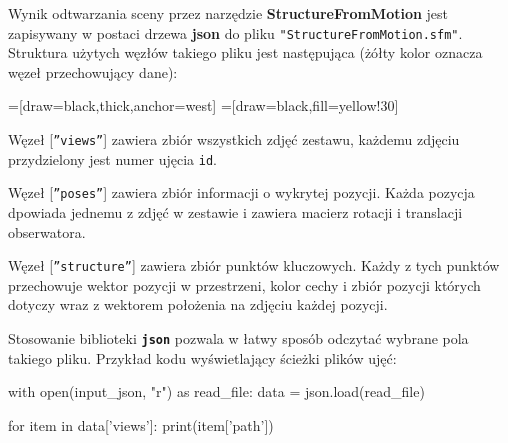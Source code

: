 Wynik odtwarzania sceny przez narzędzie \textbf{StructureFromMotion} jest zapisywany w postaci drzewa \textbf{json} do pliku \texttt{"StructureFromMotion.sfm"}.
Struktura użytych węzłów takiego pliku jest następująca (żółty kolor oznacza węzeł przechowujący dane):

=[draw=black,thick,anchor=west]
=[draw=black,fill=yellow!30]

Węzeł [\texttt{”views”}] zawiera zbiór wszystkich zdjęć zestawu, każdemu zdjęciu przydzielony jest numer ujęcia \texttt{id}.

Węzeł [\texttt{”poses”}] zawiera zbiór informacji o wykrytej pozycji. Każda pozycja dpowiada jednemu z zdjęć w zestawie i zawiera macierz rotacji i translacji obserwatora.

Węzeł [\texttt{”structure”}] zawiera zbiór punktów kluczowych. Każdy z tych punktów przechowuje wektor pozycji w przestrzeni, kolor cechy i zbiór pozycji których dotyczy wraz z wektorem położenia na zdjęciu każdej pozycji.

Stosowanie biblioteki \textbf{\texttt{json}} pozwala w łatwy sposób odczytać wybrane pola takiego pliku.
Przykład kodu wyświetlający ścieżki plików ujęć:

\begin{python}
with open(input_json, "r") as read_file:
   data = json.load(read_file)

   for item in data['views']:
      print(item['path'])
\end{python}


